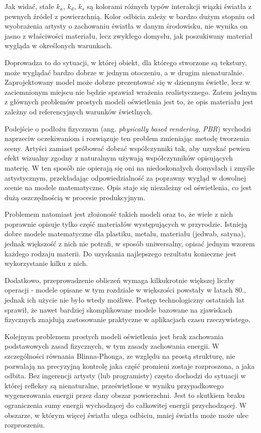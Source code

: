 \documentclass[../main.tex]{subfiles}
\begin{document}
Jak widać, stałe $k_a$, $k_d$, $k_s$ są kolorami różnych typów interakcji wiązki światła z pewnych źródeł z powierzchnią. Kolor odbicia zależy w bardzo dużym stopniu od wyobrażenia artysty o zachowaniu światła w danym środowisku, nie wynika on jasno z właściwości materiału, lecz zwykłego domysłu, jak poszukiwany materiał wygląda w określonych warunkach.

Doprowadza to do sytuacji, w której obiekt, dla którego stworzone są tekstury, może wyglądać bardzo dobrze w jednym otoczeniu, a w drugim nienaturalnie. Zaprojektowany model może dobrze prezentować się w dziennym świetle, lecz w zaciemnionym miejscu nie będzie sprawiał wrażenia realistycznego. Zatem jednym z głównych problemów prostych modeli oświetlenia jest to, że opis materiału jest zależny od referencyjnych warunków świetlnych.

Podejście o podłożu fizycznym (ang. \textit{physically based rendering, PBR}) wychodzi naprzeciw oczekiwaniom i rozwiązuje ten problem zmieniając metodę tworzenia sceny. Artyści zamiast próbować dobrać współczynniki tak, aby uzyskać pewien efekt wizualny zgodny z naturalnym używają współczynników opisujących materię. W ten sposób nie opierają się oni na niedoskonałych domysłach i zmyśle artystycznym, przekładając odpowiedzialność za poprawny wygląd w dowolnej scenie na modele matematyczne. Opis staje się niezależny od oświetlenia, co jest dużą oszczędnością w procesie produkcyjnym.

Problemem natomiast jest złożoność takich modeli oraz to, że wiele z nich poprawnie opisuje tylko część materiałów występujących w przyrodzie. Istnieją dobre modele matematyczne dla plastiku, metalu, materiału (jedwab, satyna), jednak większość z nich nie potrafi, w sposób uniwersalny, opisać jednym wzorem każdego rodzaju materii. Do uzyskania najlepszego rezultatu konieczne jest wykorzystanie kilku z nich.

Dodatkowo, przeprowadzenie obliczeń wymaga kilkukrotnie większej liczby operacji - modele opisane w tym rozdziale w większości powstały w latach 80., jednak ich użycie nie było wtedy możliwe. Postęp technologiczny ostatnich lat sprawił, że nawet bardziej skomplikowane modele bazowane na zjawiskach fizycznych znajdują zastosowanie praktyczne w aplikacjach czasu rzeczywistego.

Kolejnym problemem prostych modeli oświetlenia jest brak zachowania podstawowych zasad fizycznych, w tym zasady zachowania energii. W szczególności równania Blinna-Phonga, ze względu na prostą strukturę, nie pozwalają na precyzyjną kontrolę jaka część promieni zostaje rozproszona, a jaka odbita. Bez ingerencji artysty (lub programisty) często dochodzi do sytuacji w której refleksy są nienaturalne, prześwietlone w wyniku przypadkowego wygenerowania  energii przez dany obszar powierzchni. Jest to skutkiem braku ograniczenia sumy energii wychodzącej do całkowitej energii przychodzącej. W obszarze, w którym więcej światła ulega odbiciu, mniej światła może może ulec rozproszeniu.
\end{document}
